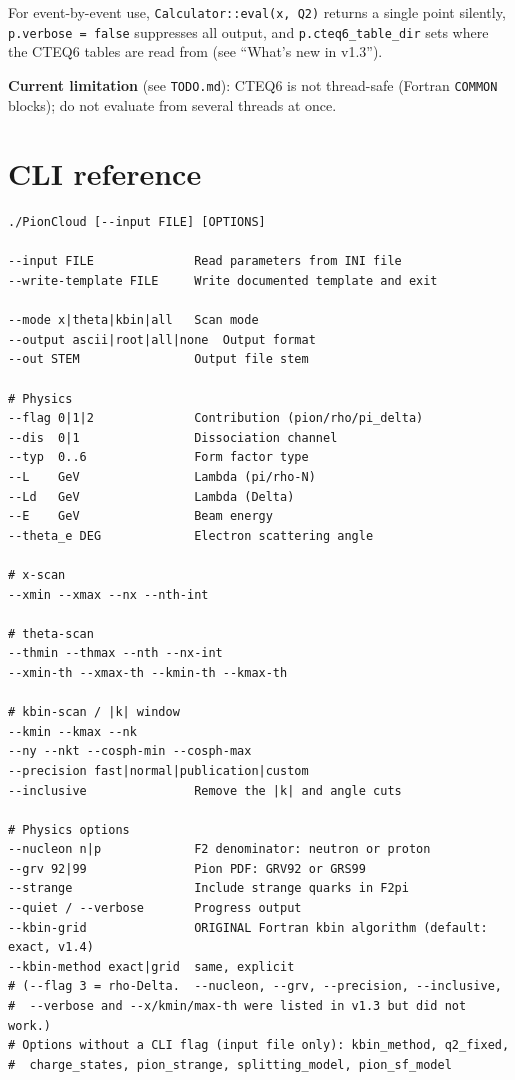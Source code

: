 \documentclass[11pt,a4paper]{article}
\newcommand{\code}[1]{\texttt{#1}}
\begin{document}
For event-by-event use, \code{Calculator::eval(x, Q2)} returns a single
point silently, \code{p.verbose = false} suppresses all output, and
\code{p.cteq6\_table\_dir} sets where the CTEQ6 tables are read from
(see ``What's new in v1.3'').

\textbf{Current limitation} (see \texttt{TODO.md}): CTEQ6 is not
thread-safe (Fortran \texttt{COMMON} blocks); do not evaluate from
several threads at once.

\section{CLI reference}

\begin{lstlisting}[style=bashstyle]
./PionCloud [--input FILE] [OPTIONS]

--input FILE              Read parameters from INI file
--write-template FILE     Write documented template and exit

--mode x|theta|kbin|all   Scan mode
--output ascii|root|all|none  Output format
--out STEM                Output file stem

# Physics
--flag 0|1|2              Contribution (pion/rho/pi_delta)
--dis  0|1                Dissociation channel
--typ  0..6               Form factor type
--L    GeV                Lambda (pi/rho-N)
--Ld   GeV                Lambda (Delta)
--E    GeV                Beam energy
--theta_e DEG             Electron scattering angle

# x-scan
--xmin --xmax --nx --nth-int

# theta-scan
--thmin --thmax --nth --nx-int
--xmin-th --xmax-th --kmin-th --kmax-th

# kbin-scan / |k| window
--kmin --kmax --nk
--ny --nkt --cosph-min --cosph-max
--precision fast|normal|publication|custom
--inclusive               Remove the |k| and angle cuts

# Physics options
--nucleon n|p             F2 denominator: neutron or proton
--grv 92|99               Pion PDF: GRV92 or GRS99
--strange                 Include strange quarks in F2pi
--quiet / --verbose       Progress output
--kbin-grid               ORIGINAL Fortran kbin algorithm (default: exact, v1.4)
--kbin-method exact|grid  same, explicit
# (--flag 3 = rho-Delta.  --nucleon, --grv, --precision, --inclusive,
#  --verbose and --x/kmin/max-th were listed in v1.3 but did not work.)
# Options without a CLI flag (input file only): kbin_method, q2_fixed,
#  charge_states, pion_strange, splitting_model, pion_sf_model
\end{lstlisting}
\end{document}
